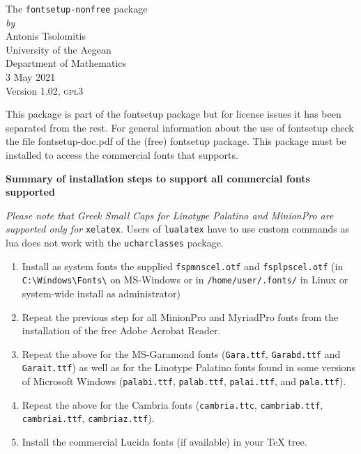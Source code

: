 \documentclass{book}
\begin{document}
  \begin{center}
    {\LARGE The \texttt{fontsetup-nonfree} package}\\[1ex]
    \textit{by}\\[1ex]
    {\large Antonis Tsolomitis}\\
University of the Aegean\\ Department of Mathematics\\[1ex]
	  \textsc{3} May \textsc{2021}\\[1ex]
	  Version 1.02, \textsc{gpl3}
  \end{center}

  This package is part of the fontsetup package but for license issues it has been
  separated from the rest. For general information about the use of fontsetup check
  the file fontsetup-doc.pdf of the (free) fontsetup package. This package must
  be installed to access the commercial fonts that supports.

\bigskip

\textbf{Summary of installation steps to support all commercial fonts supported}

\medskip

\textit{Please note that Greek Small Caps for Linotype Palatino and MinionPro
  are supported only for} \verb|xelatex|.
 Users of \verb|lualatex| have to use custom commands as lua does not work with
  the \verb|ucharclasses| package.
\medskip

\begin{enumerate}
\item Install as system fonts the supplied \verb|fspmnscel.otf|
  and \verb|fsplpscel.otf| (in \verb|C:\Windows\Fonts\| on MS-Windows or in
  \verb|/home/user/.fonts/| in Linux or system-wide install as administrator)
\item Repeat the previous step for all MinionPro and MyriadPro fonts from the
  installation of the free Adobe Acrobat Reader.
\item Repeat the above for the MS-Garamond fonts (\verb|Gara.ttf|, \verb|Garabd.ttf|
  and \verb|Garait.ttf|) as well as for the Linotype Palatino fonts
  found in some versions of Microsoft Windows (\verb|palabi.ttf|, \verb|palab.ttf|,
  \verb|palai.ttf|, and \verb|pala.ttf|).
\item Repeat the above for the Cambria fonts (\verb|cambria.ttc|, \verb|cambriab.ttf|,
  \verb|cambriai.ttf|, \verb|cambriaz.ttf|).
\item Install the commercial Lucida fonts (if available) in your TeX tree.
\end{enumerate}
\end{document}
